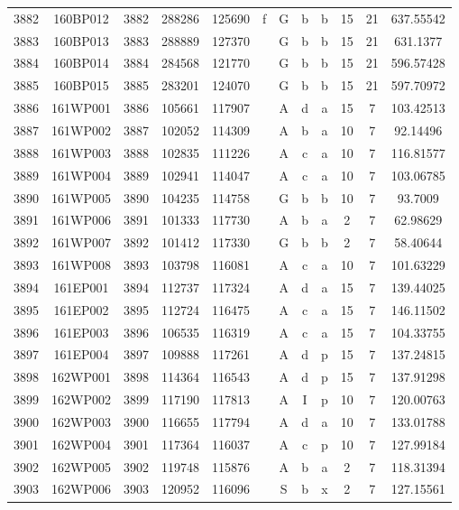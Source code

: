 \begin{tabular}{|*{12}{c|}}
3882 & 160BP012 & 3882 & 288286 & 125690 & f & G & b & b & 15 & 21 & 637.55542 \\ 
3883 & 160BP013 & 3883 & 288889 & 127370 &  & G & b & b & 15 & 21 & 631.1377 \\ 
3884 & 160BP014 & 3884 & 284568 & 121770 &  & G & b & b & 15 & 21 & 596.57428 \\ 
3885 & 160BP015 & 3885 & 283201 & 124070 &  & G & b & b & 15 & 21 & 597.70972 \\ 
3886 & 161WP001 & 3886 & 105661 & 117907 &  & A & d & a & 15 & 7 & 103.42513 \\ 
3887 & 161WP002 & 3887 & 102052 & 114309 &  & A & b & a & 10 & 7 & 92.14496 \\ 
3888 & 161WP003 & 3888 & 102835 & 111226 &  & A & c & a & 10 & 7 & 116.81577 \\ 
3889 & 161WP004 & 3889 & 102941 & 114047 &  & A & c & a & 10 & 7 & 103.06785 \\ 
3890 & 161WP005 & 3890 & 104235 & 114758 &  & G & b & b & 10 & 7 & 93.7009 \\ 
3891 & 161WP006 & 3891 & 101333 & 117730 &  & A & b & a & 2 & 7 & 62.98629 \\ 
3892 & 161WP007 & 3892 & 101412 & 117330 &  & G & b & b & 2 & 7 & 58.40644 \\ 
3893 & 161WP008 & 3893 & 103798 & 116081 &  & A & c & a & 10 & 7 & 101.63229 \\ 
3894 & 161EP001 & 3894 & 112737 & 117324 &  & A & d & a & 15 & 7 & 139.44025 \\ 
3895 & 161EP002 & 3895 & 112724 & 116475 &  & A & c & a & 15 & 7 & 146.11502 \\ 
3896 & 161EP003 & 3896 & 106535 & 116319 &  & A & c & a & 15 & 7 & 104.33755 \\ 
3897 & 161EP004 & 3897 & 109888 & 117261 &  & A & d & p & 15 & 7 & 137.24815 \\ 
3898 & 162WP001 & 3898 & 114364 & 116543 &  & A & d & p & 15 & 7 & 137.91298 \\ 
3899 & 162WP002 & 3899 & 117190 & 117813 &  & A & I & p & 10 & 7 & 120.00763 \\ 
3900 & 162WP003 & 3900 & 116655 & 117794 &  & A & d & a & 10 & 7 & 133.01788 \\ 
3901 & 162WP004 & 3901 & 117364 & 116037 &  & A & c & p & 10 & 7 & 127.99184 \\ 
3902 & 162WP005 & 3902 & 119748 & 115876 &  & A & b & a & 2 & 7 & 118.31394 \\ 
3903 & 162WP006 & 3903 & 120952 & 116096 &  & S & b & x & 2 & 7 & 127.15561 \\ 

\end{tabular}
